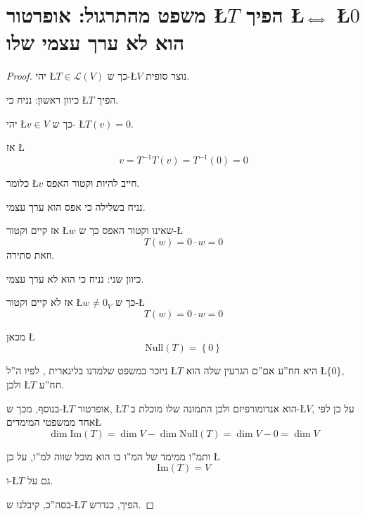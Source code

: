 \documentclass[english,hebrew]{article}
\begin{document}
\section{משפט מהתרגול: אופרטור \L{$T$} הפיך \L{$\protect\iff$} \L{$0$}
הוא לא ערך עצמי שלו}
\begin{proof}
יהי \L{$T\in\mathcal{L}(V)$} כך ש-\L{$V$} נוצר סופית.

כיוון ראשון: נניח כי \L{$T$} הפיך.

יהי \L{$v\in V$} כך ש- \L{$T\left(v\right)=0$}.

אז \L{%
\[
v=T^{-1}T\left(v\right)=T^{-1}\left(0\right)=0
\]
}%

כלומר \L{$v$} חייב להיות וקטור האפס.

נניח בשלילה כי אפס הוא ערך עצמי.

אז קיים וקטור \L{$w$} שאינו וקטור האפס כך ש-\L{%
\[
T(w)=0\cdot w=0
\]
}%
וזאת סתירה.

כיוון שני: נניח כי {\endL} הוא לא ערך עצמי.

אז לא קיים וקטור \L{$w\ne0_{V}$} כך ש-\L{%
\[
T(w)=0\cdot w=0
\]
}%

מכאן \L{%
\[
\text{Null}(T)=\left\{ 0\right\} 
\]
}%

ניזכר במשפט שלמדנו בלינארית {\endL}, לפיו ה\textquotedblright ל
\L{$T$} היא חח\textquotedblright ע אם\textquotedblright ם הגרעין
שלה הוא \L{$\{0\}$}, ולכן \L{$T$} חח\textquotedblright ע.

בנוסף, מכך ש-\L{$T$} אופרטור, \L{$T$} הוא אנדומורפיזם ולכן התמונה
שלו מוכלת ב-\L{$V$}, על כן לפי אחד ממשפטי המימדים\L{%
\[
\dim\text{Im}(T)=\dim V-\dim\text{Null}(T)=\dim V-0=\dim V
\]
}%

ותמ\textquotedblright ו ממימד של המ\textquotedblright ו בו הוא מוכל
שווה למ\textquotedblright ו, על כן \L{%
\[
\text{Im}(T)=V
\]
}%
ו-\L{$T$} גם על.

בסה\textquotedblright כ, קיבלנו ש-\L{$T$} הפיך, כנדרש.
\end{proof}
\end{document}
